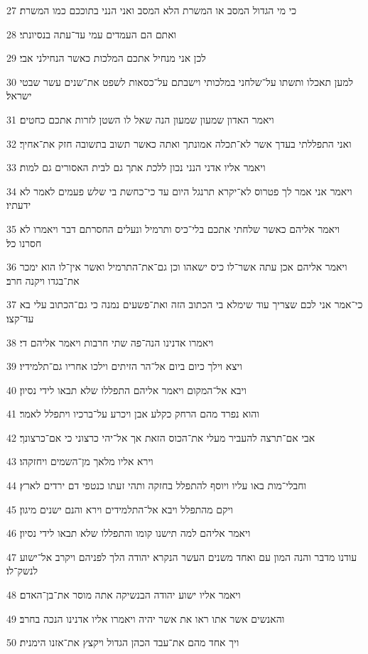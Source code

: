 \par 27 כי מי הגדול המסב או המשרת הלא המסב ואני הנני בתוככם כמו המשרת׃
\par 28 ואתם הם העמדים עמי עד־עתה בנסיונתי׃
\par 29 לכן אני מנחיל אתכם המלכות כאשר הנחילני אבי׃
\par 30 למען תאכלו ותשתו על־שלחני במלכותי וישבתם על־כסאות לשפט את־שנים עשר שבטי ישראל׃
\par 31 ויאמר האדון שמעון שמעון הנה שאל לו השטן לזרות אתכם כחטים׃
\par 32 ואני התפללתי בעדך אשר לא־תכלה אמונתך ואתה כאשר תשוב בתשובה חזק את־אחיך׃
\par 33 ויאמר אליו אדני הנני נכון ללכת אתך גם לבית האסורים גם למות׃
\par 34 ויאמר אני אמר לך פטרוס לא־יקרא תרנגל היום עד כי־כחשת בי שלש פעמים לאמר לא ידעתיו׃
\par 35 ויאמר אליהם כאשר שלחתי אתכם בלי־כיס ותרמיל ונעלים החסרתם דבר ויאמרו לא חסרנו כל׃
\par 36 ויאמר אליהם אכן עתה אשר־לו כיס ישאהו וכן גם־את־התרמיל ואשר אין־לו הוא ימכר את־בגדו ויקנה חרב׃
\par 37 כי־אמר אני לכם שצריך עוד שימלא בי הכתוב הזה ואת־פשעים נמנה כי גם־הכתוב עלי בא עד־קצו׃
\par 38 ויאמרו אדנינו הנה־פה שתי חרבות ויאמר אליהם די׃
\par 39 ויצא וילך כיום ביום אל־הר הזיתים וילכו אחריו גם־תלמידיו׃
\par 40 ויבא אל־המקום ויאמר אליהם התפללו שלא תבאו לידי נסיון׃
\par 41 והוא נפרד מהם הרחק כקלע אבן ויכרע על־ברכיו ויתפלל לאמר׃
\par 42 אבי אם־תרצה להעביר מעלי את־הכוס הזאת אך אל־יהי כרצוני כי אם־כרצונך׃
\par 43 וירא אליו מלאך מן־השמים ויחזקהו׃
\par 44 וחבלי־מות באו עליו ויוסף להתפלל בחזקה ותהי זעתו כנטפי דם ירדים לארץ׃
\par 45 ויקם מהתפלל ויבא אל־התלמידים וירא והנם ישנים מיגון׃
\par 46 ויאמר אליהם למה תישנו קומו והתפללו שלא תבאו לידי נסיון׃
\par 47 עודנו מדבר והנה המון עם ואחד משנים העשר הנקרא יהודה הלך לפניהם ויקרב אל־ישוע לנשק־לו׃
\par 48 ויאמר אליו ישוע יהודה הבנשיקה אתה מוסר את־בן־האדם׃
\par 49 והאנשים אשר אתו ראו את אשר יהיה ויאמרו אליו אדנינו הנכה בחרב׃
\par 50 ויך אחד מהם את־עבד הכהן הגדול ויקצץ את־אזנו הימנית׃
